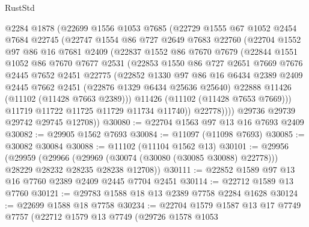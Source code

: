 \begin{lexlean}{RustStd}
\begin{coremodule}
        @2284
        @1878
        (@22699
          @1556
          @1053
          @7685
          (@22729
            @1555
            @67
            @1052
            @2454
            @7684
            @22745
            (@22747
              @1554
              @86
              @727
              @2649
              @7683
              @22760
              (@22704
                @1552
                @97
                @86
                @16
                @7681
                @2409
                (@22837
                  @1552
                  @86
                  @7670
                  @7679
                  (@22844
                    @1551
                    @1052
                    @86
                    @7670
                    @7677
                    @2531
                    (@22853
                      @1550
                      @86
                      @727
                      @2651
                      @7669
                      @7676
                      @2445
                      @7652
                      @2451
                      @22775
                      (@22852
                        @1330
                        @97
                        @86
                        @16
                        @6434
                        @2389
                        @2409
                        @2445
                        @7662
                        @2451
                        (@22876 @1329 @6434 @25636 @25640)
                        @22888
                        @11426
                        (@11102 (@11428 @7663 @2389)))
                      @11426
                      (@11102 (@11428 @7653 @7669)))
                    @11719
                    @11722
                    @11725
                    @11729
                    @11734
                    @11740))
                @22778))))
        @29736
        @29739
        @29742
        @29745
        @12708))
@30080 := @22704 @1563 @97 @13 @16 @7693 @2409
@30082 := @29905 @1562 @7693
@30084 := @11097 (@11098 @7693)
@30085 := @30082 @30084
@30088 := @11102 (@11104 @1562 @13)
@30101 := @29956
    (@29959
      (@29966 (@29969 (@30074 (@30080 (@30085 @30088) @22778))) @28229 @28232 @28235 @28238 @12708))
@30111 := @22852 @1589 @97 @13 @16 @7760 @2389 @2409 @2445 @7704 @2451
@30114 := @22712 @1589 @13 @7760
@30121 := @29783 @1588 @18 @13 @2389 @7758 @2284 @1628
@30124 := @22699 @1588 @18 @7758
@30234 := @22704
    @1579
    @1587
    @13
    @17
    @7749
    @7757
    (@22712
      @1579
      @13
      @7749
      (@29726
        @1578
        @1053

\end{coremodule}
\end{lexlean}

